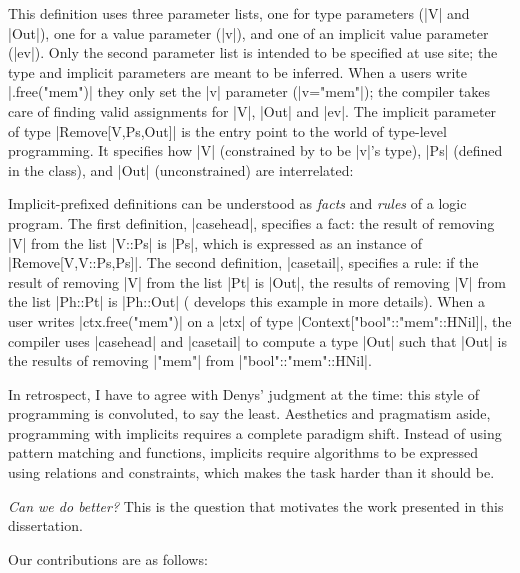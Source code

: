 \noindent
This definition uses three parameter lists, one for type parameters (|V| and |Out|), one for a value parameter (|v|), and one of an implicit value parameter (|ev|).
Only the second parameter list is intended to be specified at use site; the type and implicit parameters are meant to be inferred.
When a users write |.free("mem")| they only set the |v| parameter (|v="mem"|); the compiler takes care of finding valid assignments for |V|, |Out| and |ev|.
The implicit parameter of type |Remove[V,Ps,Out]| is the entry point to the world of type-level programming.
It specifies how |V| (constrained by to be |v|'s type), |Ps| (defined in the class), and |Out| (unconstrained) are interrelated:

\memImplicitRemove

\noindent
Implicit-prefixed definitions can be understood as \emph{facts} and \emph{rules} of a logic program.
The first definition, |casehead|, specifies a fact: the result of removing |V| from the list |V::Ps| is |Ps|, which is expressed as an instance of |Remove[V,V::Ps,Ps]|.
The second definition, |casetail|, specifies a rule: if the result of removing |V| from the list |Pt| is |Out|, the results of removing |V| from the list |Ph::Pt| is |Ph::Out| ( develops this example in more details).
When a user writes |ctx.free("mem")| on a |ctx| of type |Context["bool"::"mem"::HNil]|, the compiler uses |casehead| and |casetail| to compute a type |Out| such that |Out| is the results of removing |"mem"| from |"bool"::"mem"::HNil|.

In retrospect, I have to agree with Denys' judgment at the time: this style of programming is convoluted, to say the least.
Aesthetics and pragmatism aside, programming with implicits requires a complete paradigm shift.
Instead of using pattern matching and functions, implicits require algorithms to be expressed using relations and constraints, which makes the task harder than it should be.

\emph{Can we do better?} This is the question that motivates the work presented in this dissertation.

Our contributions are as follows:


